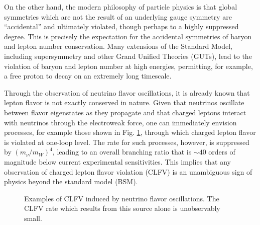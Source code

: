 \documentclass{book}[12pt]
\begin{document}
On the other hand, the modern philosophy of particle physics is that global symmetries which are not the result of an underlying gauge symmetry are ``accidental'' and ultimately violated, though perhaps to a highly suppressed degree. This is precisely the expectation for the accidental symmetries of baryon and lepton number conservation. Many extensions of the Standard Model, including supersymmetry and other Grand Unified Theories (GUTs), lead to the violation of baryon and lepton number at high energies, permitting, for example, a free proton to decay on an extremely long timescale. 

Through the observation of neutrino flavor oscillations, it is already known that lepton flavor is not exactly conserved in nature. Given that neutrinos oscillate between flavor eigenstates as they propagate and that charged leptons interact with neutrinos through the electroweak force, one can immediately envision processes, for example those shown in Fig. \ref{fig:neutrino_clfv}, through which charged lepton flavor is violated at one-loop level. The rate for such processes, however, is suppressed by $(m_{\nu}/m_W)^4$, leading to an overall branching ratio that is $\sim 40$ orders of magnitude below current experimental sensitivities. This implies that any observation of charged lepton flavor violation (CLFV) is an unambiguous sign of physics beyond the standard model (BSM).

\begin{figure}
\centering
{}
\hfill
{}
\caption{Examples of CLFV induced by neutrino flavor oscillations. The CLFV rate which results from this source alone is unobservably small.}
\label{fig:neutrino_clfv}
\end{figure}
 
\end{document}
